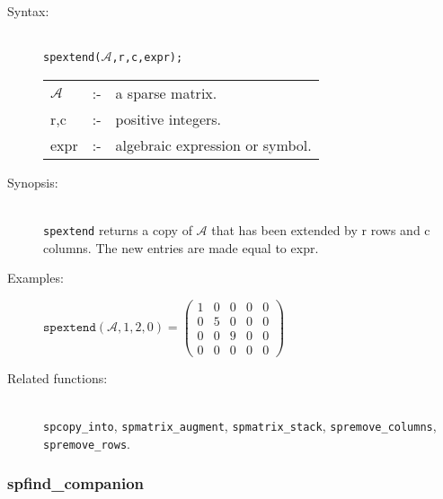\begin{description}
\item[Syntax:]\mbox{}\\
 \texttt{spextend($\mathcal{A}$,r,c,expr);}\\[2mm]
\begin{tabular}{l l l}
$\mathcal{A}$ &:-& a sparse matrix. \\
r,c        &:-& positive integers. \\
expr      &:-& algebraic expression or symbol.
\end{tabular}

\item[Synopsis:]\mbox{}\\
                \texttt{spextend} returns a copy of $\mathcal{A}$ that has been 
                extended by r rows and c columns. The new entries are
                made equal to expr.

\item[Examples:]
\begin{flushleft}  
\begin{math}  
\texttt{spextend}(\mathcal{A},1,2,0) =
\begin{pmatrix} 1 & 0 & 0 & 0 & 0 \\ 0 & 5 & 0 & 0 & 0
\\ 0 & 0 & 9 & 0 & 0 \\ 0 & 0 & 0 & 0 & 0 
\end{pmatrix}
\end{math}  
\end{flushleft}

\item[Related functions:]\mbox{}\\
\texttt{spcopy\_into}, \texttt{spmatrix\_augment}, 
\texttt{spmatrix\_stack}, \texttt{spremove\_columns}, \texttt{spremove\_rows}.

\end{description}


\subsubsection{spfind\_companion}
\label{sparse:spfind_companion}

